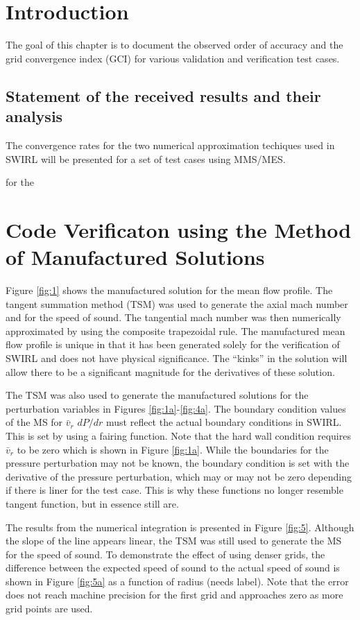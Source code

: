 \section{Introduction}
The goal of this chapter is to document the observed order of accuracy and the 
grid convergence index (GCI) for various validation and verification test cases.

\subsection{Statement of the received results and their analysis}
The convergence rates for the two numerical approximation techiques used in
SWIRL will be presented for a set of test cases using MMS/MES. 


for the 
\section{Code Verificaton using the Method of Manufactured Solutions}
Figure \ref{fig:1} shows the manufactured solution for the mean flow profile. 
The tangent summation method (TSM) was used to generate the axial mach number and 
for the speed of sound.   The tangential mach number was then numerically approximated by 
using the composite trapezoidal rule. The manufactured mean flow profile 
is unique in that it has been generated solely for the verification of SWIRL 
and does not have physical significance. The ``kinks'' in the solution will allow
there to be a significant magnitude for the derivatives of these solution. 

The TSM was also used to generate the manufactured solutions for the perturbation
variables in Figures \ref{fig:1a}-\ref{fig:4a}. The boundary condition values of 
the MS for $\bar{v}_r$ $dP/dr$ must reflect the actual boundary conditions in SWIRL. 
This is set by using a fairing function. Note that the hard wall condition requires
$\bar{v}_r$ to be zero which is shown in Figure \ref{fig:1a}. While the boundaries for the 
pressure perturbation may not be known, the boundary condition is set with the 
derivative of the pressure perturbation, which may or may not be zero depending
if there is liner for the test case. This is why these functions no longer resemble
tangent function, but in essence still are. 

The results from the numerical integration is presented in Figure \ref{fig:5}. Although 
the slope of the line appears linear, the TSM was still used to generate the 
MS for the speed of sound. To demonstrate the effect of using denser grids, the 
difference between the expected speed of sound to the actual speed of sound is 
shown in Figure \ref{fig:5a} as a function of radius (needs label). 
Note that the error does not reach machine precision for the first grid and 
approaches zero as more grid points are used. 

